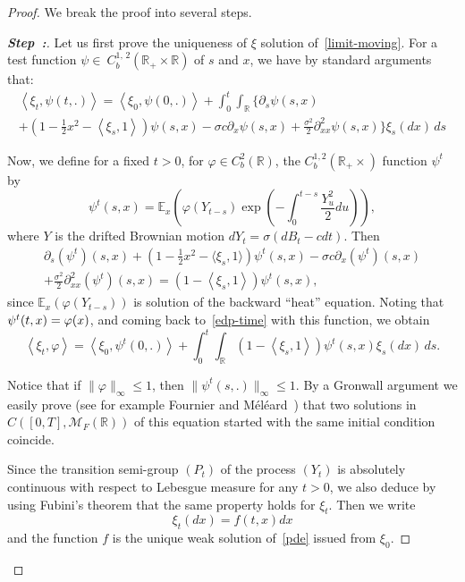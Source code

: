 \documentclass[AHL,Unicode,longabstracts,published]{cedram}
\newcommand{\Mo}{\mathcal{M}}
\newcommand*\R{\mathbb{R}}
\newcommand*\E{\mathbb{E}}
\newcounter{stepcount}
\newenvironment{step}{\refstepcounter{stepcount}\begin{proof}[\textbf{Step~\thestepcount:}]}{\let\qed\relax\end{proof}}
\begin{document}
\begin{proof}
We break the proof into several steps.

\begin{step}
Let us first prove the uniqueness of $\xi$ solution of~\eqref{limit-moving}. For a test function $\psi\in~C^{1,\,2}_{b}(\R_{+}\times\R)$ of $s$ and $x$, we have by standard arguments that:
\begin{multline}\label{edp-time}
\left\langle \xi_{t},\psi(t,.)\right\rangle
=\left\langle \xi_{0},\psi(0,.)\right\rangle
+\int_{0}^{t} \int_{\R} \bigg\{ \partial_s \psi(s,x)\\
+ \left(1-\frac{1}{2}x^2-\left\langle \xi_{s}, 1\right\rangle\right)\psi(s,x)
-\sigma c \partial_x \psi(s,x)
 +\frac{\sigma^2}{2}\partial^2_{xx}\psi(s,x)\bigg\} \xi_{s}(dx)\, ds
\end{multline}

Now, we define for a fixed $t>0$, for $\varphi\in C^2_{b}(\R)$, the $C^{1,2}_{b}(\R_+\times)$ function $\psi^t$ by
\[
\psi^t(s,x) = \E_{x}\left(\varphi\left(Y_{t-s}\right)\exp\left(-\int_{0}^{t-s}\frac{Y^2_{u}}{2}du\right)\right),
\]
where $Y$ is the drifted Brownian motion $dY_{t}= \sigma(dB_{t}-cdt)$. Then
\begin{multline}
\partial_s\left(\psi^t\right)(s,x)+ \left(1-\frac{1}{2}x^2-\langle \xi_{s}, 1\rangle\right)\psi^t(s,x)-\sigma c \partial_x\left(\psi^t\right)(s,x)\\+\frac{\sigma^2}{2}\partial^2_{xx}\left(\psi^t\right)(s,x)
= \left(1-\left\langle \xi_{s}, 1\right\rangle\right)\psi^t(s,x),
\end{multline}
since $\E_{x}(\varphi(Y_{t-s}))$ is solution of the backward ``heat'' equation. Noting that $\psi^t(t,x)\linebreak = \varphi(x)$, and coming back to~\eqref{edp-time} with this function, we obtain
\[
\left\langle \xi_{t},\varphi\right\rangle=\left\langle \xi_{0}, \psi^t(0,.)\right\rangle+\int_{0}^{t} \int_{\R} \left(1-\left\langle \xi_{s}, 1\right\rangle\right)\psi^t(s,x) \xi_{s}(dx)\, ds.
\]

Notice that if $\|\varphi\|_\infty \le 1$, then $\|\psi^t(s,.)\|_{\infty}\le 1$. By a Gronwall argument we easily prove (see for example Fournier and Méléard~\cite{fourniermeleard}) that two solutions in $C([0,T],\Mo_{F}(\R))$ of this equation started with the same initial condition coincide.

Since the transition semi-group $(P_{t})$ of the process $(Y_{t})$ is absolutely continuous with respect to Lebesgue measure for any $t>0$, we also deduce by using Fubini's theorem that the same property holds for $\xi_{t}$. Then we write
\[
\xi_{t}(dx) = f(t,x) dx
\]
and the function $f$ is the unique weak solution of~\eqref{pde} issued from $\xi_{0}$.
\end{step}


\end{proof}
\end{document}
